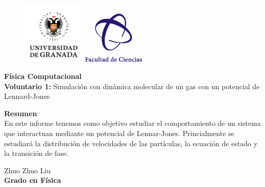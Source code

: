 \documentclass[11pt, twoside]{article} %
\begin{document}
\begin{figure}[h!]
	\includegraphics[width=3cm]{Icons/ugr.jpg}
	\endminipage
	\includegraphics[height = 2.5cm, width=3cm]{Icons/facultad_ciencias.png}
	\endminipage
\end{figure}

\vspace{0.3cm}

\begin{center}
    \Huge \textbf{Física Computacional}\\
    		\vspace{0.4cm}
    \LARGE \textbf{Voluntario 1:}  
    Simulación con dinámica molecular de un gas con un potencial de Lennard-Jones
\end{center}

\vspace{1cm}

\vspace{1cm}

\begin{center}
    \large \textbf{Resumen}\\
    		\vspace{0.2cm}
    \normalsize
    En este informe tenemos como objetivo estudiar el comportamiento de un sistema que
    interactuan mediante un potencial de Lennar-Jones. Princialmente se estudiará 
    la distribución de velocidades de las partículas, la ecuación de estado y la 
    transición de fase.

\end{center}

\vspace{1cm}

\begin{flushright}
    \large Zhuo Zhuo Liu 
    \\
    \vspace{0.4cm}
    \textbf{Grado en Física}
\end{flushright}
\end{document}
